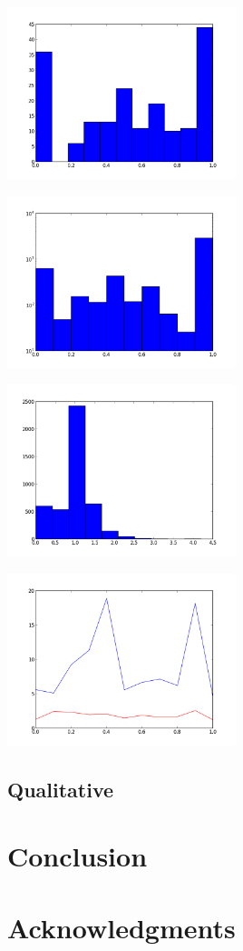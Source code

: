 \documentclass{proc}
\begin{document}
\begin{center}
\includegraphics[width=0.5\textwidth]{images/github-unpopular.png}
\end{center}

\begin{center}
\includegraphics[width=0.5\textwidth]{images/github-q-histo.png}
\end{center}

\begin{center}
\includegraphics[width=0.5\textwidth]{images/github-smallworld-histo.png}
\end{center}

\begin{center}
\includegraphics[width=0.5\textwidth]{images/github-graph.png}
\end{center}

\subsection{Qualitative}

\section{Conclusion}
\section{Acknowledgments}



\end{document}
